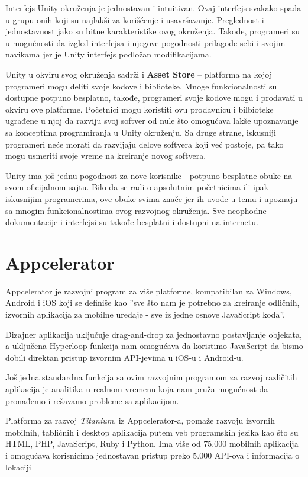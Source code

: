 \documentclass[12pt]{article}
\begin{document}
Interfejs Unity okruženja je jednostavan i intuitivan. 
Ovaj interfejs svakako spada u grupu onih koji su najlakši za korišćenje i usavršavanje. Preglednost i jednostavnost jako su bitne karakteristike
ovog okruženja. Takođe, programeri su u mogućnosti da izgled interfejsa i njegove pogodnosti prilagode sebi i svojim navikama jer je Unity interfejs
podložan modifikacijama. 

Unity u okviru svog okruženja sadrži i \textbf{Asset Store} – platforma na kojoj programeri mogu deliti svoje kodove i biblioteke. Mnoge funkcionalnosti su dostupne potpuno besplatno, takođe, programeri svoje kodove mogu i prodavati u okviru ove platforme. Početnici mogu koristiti ovu prodavnicu i bilbioteke ugrađene u njoj da razviju svoj softver od nule što omogućava lakše upoznavanje sa konceptima programiranja u Unity okruženju.
Sa druge strane, iskusniji programeri neće morati da razvijaju delove softvera koji već postoje, pa tako mogu usmeriti svoje vreme na kreiranje novog softvera.

Unity ima još jednu pogodnost za nove korisnike - potpuno besplatne obuke na svom oficijalnom sajtu.
Bilo da se radi o apsolutnim početnicima ili ipak iskusnijim programerima, ove obuke svima znače jer ih uvode u temu i upoznaju sa mnogim funkcionalnostima ovog razvojnog okruženja.
Sve neophodne dokumentacije i interfejsi su takođe besplatni i dostupni na internetu.

\section{Appcelerator}
Appcelerator je razvojni program za više platforme, kompatibilan za Windows, Android i iOS koji se definiše kao  ''sve što nam je potrebno za kreiranje odličnih, izvornih aplikacija za mobilne uređaje - sve iz jedne osnove JavaScript koda''.\cite{Appcelerator}

Dizajner aplikacija uključuje drag-and-drop za jednostavno postavljanje objekata, a uključena Hyperloop funkcija nam omogućava da koristimo JavaScript da bismo dobili direktan pristup izvornim API-jevima u iOS-u i Android-u.

Još jedna standardna funkcija sa ovim razvojnim programom za razvoj različitih aplikacija je analitika u realnom vremenu koja nam pruža mogućnost da pronađemo i rešavamo probleme sa aplikacijom.

Platforma za razvoj \textit{Titanium}, iz Appcelerator-a, pomaže razvoju izvornih mobilnih, tabličnih i desktop aplikacija putem veb programskih jezika kao što su HTML, PHP, JavaScript, Ruby i Python. Ima više od 75.000 mobilnih aplikacija i omogućava korisnicima jednostavan pristup preko 5.000 API-ova i informacija o lokaciji
\end{document}
